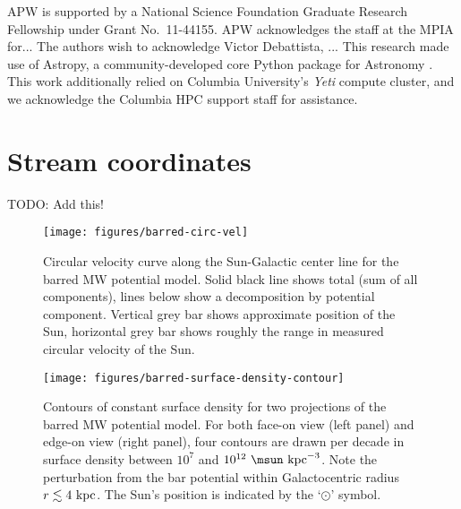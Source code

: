 \documentclass[letterpaper,12pt,preprint]{aastex}
\newcommand{\todo}[1]{{\color{red} TODO: #1}}
\begin{document}
\acknowledgements
APW is supported by a National Science Foundation Graduate Research Fellowship under Grant No.\ 11-44155.
APW acknowledges the staff at the MPIA for...
The authors wish to acknowledge Victor Debattista, ...
This research made use of Astropy, a community-developed core Python package for Astronomy \citep{astropy13}.
This work additionally relied on Columbia University's \emph{Yeti} compute cluster, and we acknowledge the Columbia HPC support staff for assistance. \\




\appendix
\section{Stream coordinates} \label{sec:rotationmatrix}
\todo{Add this!}

\clearpage
\begin{figure}[p]
\begin{center}
\texttt{[image: figures/barred-circ-vel]}
\caption{Circular velocity curve along the Sun-Galactic center line for the barred MW potential model. Solid black line shows total (sum of all components), lines below show a decomposition by potential component. Vertical grey bar shows approximate position of the Sun, horizontal grey bar shows roughly the range in measured circular velocity of the Sun.}
\label{fig:circ-vel-barred}
\end{center}
\end{figure}

\clearpage
\begin{figure}[p]
\begin{center}
\texttt{[image: figures/barred-surface-density-contour]}
\caption{Contours of constant surface density for two projections of the barred MW potential model. For both face-on view (left panel) and edge-on view (right panel), four contours are drawn per decade in surface density between $10^7$ and $10^{12}~\msun~{\rm kpc}^{-3}$. Note the perturbation from the bar potential within Galactocentric radius $r \lesssim 4~{\rm kpc}$. The Sun's position is indicated by the `$\odot$' symbol.}
\label{fig:surface-density-barred}
\end{center}
\end{figure}
\end{document}
